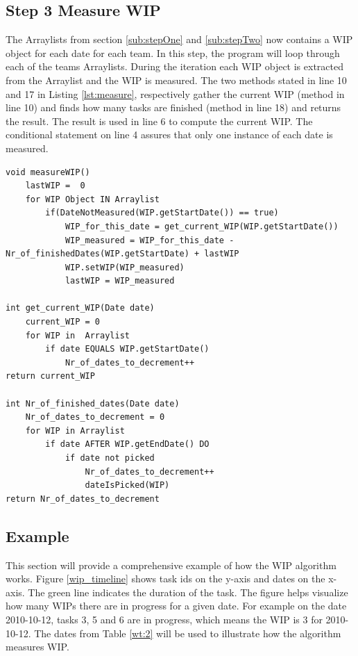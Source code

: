 \documentclass[UKenglish]{ifimaster}  %
\begin{document}
\subsection{Step 3 Measure WIP}
\vspace{-2.0em}
The Arraylists from section \ref{sub:stepOne}  and \ref{sub:stepTwo} now contains a WIP object for each date for each team. In this step, the program will loop through each of the teams Arraylists. During the iteration each WIP object is extracted from the Arraylist and the WIP is measured. The two methods stated in line 10 and 17 in Listing \ref{lst:measure}, respectively gather the current WIP (method in line 10) and finds how many tasks are finished (method in line 18) and returns the result. The result is used in line 6 to compute the current WIP. The conditional statement on line 4 assures that only one instance of each date is measured. 
\begin{minipage}{\textwidth} 
\begin{lstlisting}[caption={WIP measurement},label={lst:measure}]
void measureWIP()
	lastWIP =  0
	for WIP Object IN Arraylist	
		if(DateNotMeasured(WIP.getStartDate()) == true)
			WIP_for_this_date = get_current_WIP(WIP.getStartDate())  
			WIP_measured = WIP_for_this_date - Nr_of_finishedDates(WIP.getStartDate) + lastWIP
			WIP.setWIP(WIP_measured)
			lastWIP = WIP_measured 

int get_current_WIP(Date date)
	current_WIP = 0
	for WIP in  Arraylist
		if date EQUALS WIP.getStartDate()
			Nr_of_dates_to_decrement++
return current_WIP
			 	
int Nr_of_finished_dates(Date date)
	Nr_of_dates_to_decrement = 0
	for WIP in Arraylist
		if date AFTER WIP.getEndDate() DO
			if date not picked
				Nr_of_dates_to_decrement++
				dateIsPicked(WIP)				
return Nr_of_dates_to_decrement 
 \end{lstlisting}
  \end{minipage}

\subsection{Example}
\label{sec:Example}
This section will provide a comprehensive example of how the WIP algorithm works.  
Figure \ref{wip_timeline}  shows task ids on the y-axis and dates on the x-axis. The green line indicates the duration of the task. The figure helps  visualize how many WIPs there are in progress for a given date. For example on the date 2010-10-12, tasks 3, 5 and 6 are in progress, which means the WIP is 3 for 2010-10-12. The dates from Table \ref{wt:2}  will be used to illustrate how the algorithm measures WIP.
\end{document}
